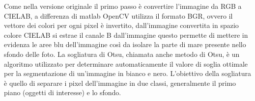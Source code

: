 \documentclass[a4paper,12pt]{report}
\begin{document}
      Come nella versione originale il primo passo è convertire l'immagine da RGB a CIELAB, 
      a differenza di matlab OpenCV utilizza il formato BGR, ovvero il vettore dei colori per ogni pixel è invertito,
      dall'immagine convertita in spazio colore CIELAB si estrae il canale B dall'immagine questo permette di mettere in evidenza 
      le aree blu dell'immagine così da isolare la parte di mare presente nello sfondo delle foto.
      \newpage
      La sogliatura di Otsu, chiamata anche metodo di Otsu, è un algoritmo utilizzato per determinare automaticamente il valore di soglia ottimale per la segmentazione di un'immagine in bianco e nero.
      L'obiettivo della sogliatura è quello di separare i pixel dell'immagine in due classi, generalmente il primo piano (oggetti di interesse) e lo sfondo.
      \begin{figure}
        \centering
        

\end{figure}
\end{document}
